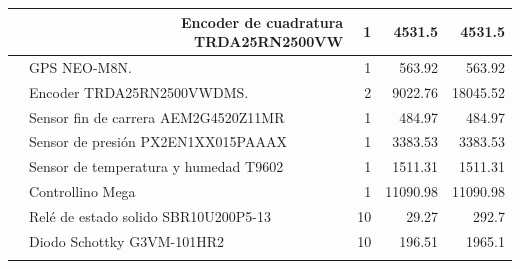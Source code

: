 \begin{landscape}
\begin{longtable}{|r|r|r|l|r|}
    \hline
    \rowcolor[rgb]{ 1,  .902,  .6} \multicolumn{1}{|p{5.355em}|}{Elevación} & \multicolumn{1}{p{16.43em}|}{\cellcolor[rgb]{ 1,  1,  1}Encoder de cuadratura TRDA25RN2500VW} & \cellcolor[rgb]{ 1,  1,  1}1 & \multicolumn{1}{r|}{\cellcolor[rgb]{ 1,  1,  1}4531.5} & \cellcolor[rgb]{ 1,  1,  1}4531.5 \\
    \hline
    \rowcolor[rgb]{ .855,  .812,  .89} \multicolumn{1}{|c|}{\multirow{6}[12]{*}{Mando Central}} & \multicolumn{1}{l|}{\cellcolor[rgb]{ 1,  1,  1}GPS NEO-M8N.} & \cellcolor[rgb]{ 1,  1,  1}1 & \multicolumn{1}{r|}{\cellcolor[rgb]{ 1,  1,  1}563.92} & \cellcolor[rgb]{ 1,  1,  1}563.92 \\
\cmidrule{Mando Central}    \rowcolor[rgb]{ .855,  .812,  .89}       & \multicolumn{1}{l|}{\cellcolor[rgb]{ 1,  1,  1}Encoder TRDA25RN2500VWDMS.} & \cellcolor[rgb]{ 1,  1,  1}2 & \multicolumn{1}{r|}{\cellcolor[rgb]{ 1,  1,  1}9022.76} & \cellcolor[rgb]{ 1,  1,  1}18045.52 \\
\cmidrule{Mando Central}    \rowcolor[rgb]{ .855,  .812,  .89}       & \multicolumn{1}{l|}{\cellcolor[rgb]{ 1,  1,  1}Sensor fin de carrera AEM2G4520Z11MR} & \cellcolor[rgb]{ 1,  1,  1}1 & \multicolumn{1}{r|}{\cellcolor[rgb]{ 1,  1,  1}484.97} & \cellcolor[rgb]{ 1,  1,  1}484.97 \\
\cmidrule{Mando Central}    \rowcolor[rgb]{ .855,  .812,  .89}       & \multicolumn{1}{l|}{\cellcolor[rgb]{ 1,  1,  1}Sensor de presión PX2EN1XX015PAAAX} & \cellcolor[rgb]{ 1,  1,  1}1 & \multicolumn{1}{r|}{\cellcolor[rgb]{ 1,  1,  1}3383.53} & \cellcolor[rgb]{ 1,  1,  1}3383.53 \\
\cmidrule{Mando Central}    \rowcolor[rgb]{ .855,  .812,  .89}       & \multicolumn{1}{l|}{\cellcolor[rgb]{ 1,  1,  1}Sensor de temperatura y humedad T9602} & \cellcolor[rgb]{ 1,  1,  1}1 & \multicolumn{1}{r|}{\cellcolor[rgb]{ 1,  1,  1}1511.31} & \cellcolor[rgb]{ 1,  1,  1}1511.31 \\
\cmidrule{Mando Central}    \rowcolor[rgb]{ .855,  .812,  .89}       & \multicolumn{1}{l|}{\cellcolor[rgb]{ 1,  1,  1}Controllino Mega} & \cellcolor[rgb]{ 1,  1,  1}1 & \multicolumn{1}{r|}{\cellcolor[rgb]{ 1,  1,  1}11090.98} & \cellcolor[rgb]{ 1,  1,  1}11090.98 \\
    \hline
          & \multicolumn{1}{l|}{Relé de estado solido SBR10U200P5-13} & 10    & \multicolumn{1}{r|}{29.27} & 292.7 \\
    \hline
          & \multicolumn{1}{l|}{Diodo Schottky G3VM-101HR2} & 10    & \multicolumn{1}{r|}{196.51} & 1965.1 \\
\hline
          &       &       &       &  \\


\end{longtable}
\end{landscape}
